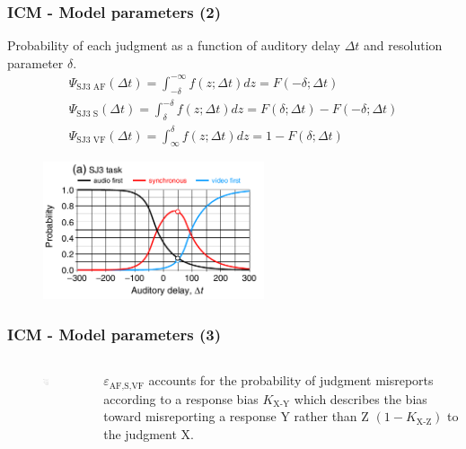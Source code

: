 \documentclass[xcolor={fixpdftex,hyperref,x11names},10pt,pdftex,hyperref={pdftex}]{beamer}
\begin{document}
\begin{frame}
 \frametitle{ICM - Model parameters (2)}
  Probability of each judgment as a function of auditory delay $\Delta t$ and resolution parameter $\delta$.
  \begin{equation}
   \begin{array}{l}
    \Psi_\text{SJ3 AF}(\Delta t)=\int_{-\delta}^{-\infty} f(z;\Delta t)dz=F(-\delta;\Delta t)\\
    \Psi_\text{SJ3 S}(\Delta t)=\int_{\delta}^{-\delta} f(z;\Delta t)dz=F(\delta;\Delta t)-F(-\delta;\Delta t)\\
    \Psi_\text{SJ3 VF}(\Delta t)=\int_{\infty}^{\delta} f(z;\Delta t)dz=1-F(\delta;\Delta t)
   \end{array}
  \end{equation}
  \begin{figure}[ht!]
   \includegraphics[width=65mm,totalheight=0.5\textheight]{figs/SJ3-psychometric-function.png}
  \end{figure}
\end{frame}


\begin{frame}
  \frametitle{ICM - Model parameters (3)}
   \begin{columns}[t]
    \begin{column}{0.50\textwidth}
    \begin{figure}[h]
      \includegraphics[width=50mm]{figs/SJ3_Figure3.jpg}
    \end{figure}
   \end{column}
  \begin{column}{0.50\textwidth}
   \vfill
   $\varepsilon_\text{AF,S,VF}$ accounts for the probability of 
   judgment misreports according to a response bias $K_\text{X-Y}$ which 
   describes the bias toward misreporting a response Y rather than Z $(1-K_\text{X-Z})$ to the judgment X.  
  \end{column}
 \end{columns}
\end{frame}
\end{document}
